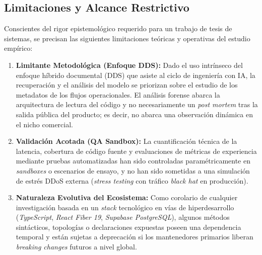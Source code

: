 \subsection{Limitaciones y Alcance Restrictivo}
Conscientes del rigor epistemológico requerido para un trabajo de tesis de sistemas, se precisan las siguientes limitaciones teóricas y operativas del estudio empírico:
\begin{enumerate}
    \item \textbf{Limitante Metodológica (Enfoque DDS):} Dado el uso intrínseco del enfoque híbrido documental (DDS) que asiste al ciclo de ingeniería con IA, la recuperación y el análisis del modelo se priorizan sobre el estudio de los metadatos de los flujos operacionales. El análisis forense abarca la arquitectura de lectura del código y no necesariamente un \textit{post mortem} tras la salida pública del producto; es decir, no abarca una observación dinámica en el nicho comercial.
    \item \textbf{Validación Acotada (QA Sandbox):} La cuantificación técnica de la latencia, cobertura de código fuente y evaluaciones de métricas de experiencia mediante pruebas automatizadas han sido controladas paramétricamente en \textit{sandboxes} o escenarios de ensayo, y no han sido sometidas a una simulación de estrés DDoS externa (\textit{stress testing} con tráfico \textit{black hat} en producción).
    \item \textbf{Naturaleza Evolutiva del Ecosistema:} Como corolario de cualquier investigación basada en un \textit{stack} tecnológico en vías de hiperdesarrollo (\textit{TypeScript}, \textit{React Fiber 19}, \textit{Supabase PostgreSQL}), algunos métodos sintácticos, topologías o declaraciones expuestas poseen una dependencia temporal y están sujetas a deprecación si los mantenedores primarios liberan \textit{breaking changes} futuros a nivel global.
\end{enumerate}
